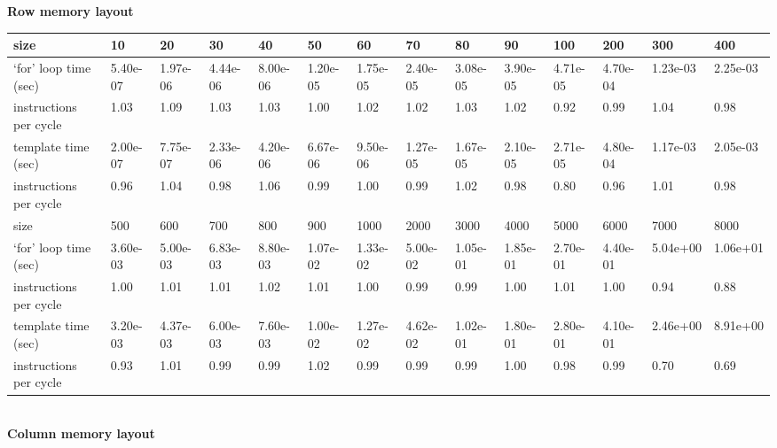 \documentclass[a4paper,11pt]{article}
\begin{document}
\bf
Row memory layout\\
\rm

\begin{tabular}{|l|l|l|l|l|l|l|l|l|l|l|l|l|l|}
\hline
size & 10 & 20 & 30 & 40 & 50 & 60 & 70 & 80 & 90 & 100 & 200 & 300 & 400 \\
\hline
`for' loop time (sec) & 5.40e-07 & 1.97e-06 & 4.44e-06 & 8.00e-06 & 1.20e-05 & 1.75e-05 & 2.40e-05 & 3.08e-05 & 3.90e-05 & 4.71e-05 & 4.70e-04 & 1.23e-03 & 2.25e-03\\
instructions per cycle & 1.03 & 1.09 & 1.03 & 1.03 & 1.00 & 1.02 & 1.02 & 1.03 & 1.02 & 0.92 & 0.99 & 1.04 & 0.98 \\
\hline
template time (sec) & 2.00e-07 & 7.75e-07 & 2.33e-06 & 4.20e-06 & 6.67e-06 & 9.50e-06 & 1.27e-05 & 1.67e-05 & 2.10e-05 & 2.71e-05 & 4.80e-04 & 1.17e-03 & 2.05e-03 \\
instructions per cycle & 0.96 & 1.04 & 0.98 & 1.06 & 0.99 & 1.00 & 0.99 & 1.02 & 0.98 & 0.80 & 0.96 & 1.01 & 0.98 \\
\hline
\hline
size & 500 & 600 & 700 & 800 & 900 & 1000 & 2000 & 3000 & 4000 & 5000 & 6000 & 7000 & 8000\\
\hline
`for' loop time (sec) & 3.60e-03 & 5.00e-03 & 6.83e-03 & 8.80e-03 & 1.07e-02 & 1.33e-02 & 5.00e-02 & 1.05e-01 & 1.85e-01 & 2.70e-01 & 4.40e-01 & 5.04e+00 & 1.06e+01 \\
instructions per cycle & 1.00 & 1.01 & 1.01 & 1.02 & 1.01 & 1.00 & 0.99 & 0.99 & 1.00 & 1.01 & 1.00 & 0.94 & 0.88\\
\hline
template time (sec) & 3.20e-03 & 4.37e-03 & 6.00e-03 & 7.60e-03 & 1.00e-02 & 1.27e-02 & 4.62e-02 & 1.02e-01 & 1.80e-01 & 2.80e-01 & 4.10e-01 & 2.46e+00 & 8.91e+00\\
instructions per cycle & 0.93 & 1.01 & 0.99 & 0.99 & 1.02 & 0.99 & 0.99 & 0.99 & 1.00 & 0.98 & 0.99 & 0.70 & 0.69\\
\hline
\end{tabular}\\

\vspace{1cm}
\bf
Column memory layout\\
\rm
\end{document}
